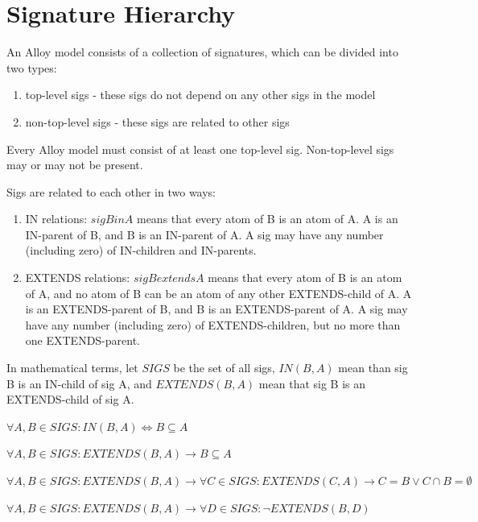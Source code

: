 \section{Signature Hierarchy}


An Alloy model consists of a collection of signatures, which can be divided into two types:

\begin{enumerate}
	\item top-level sigs - these sigs do not depend on any other sigs in the model
	\item non-top-level sigs - these sigs are related to other sigs
\end{enumerate}

Every Alloy model must consist of at least one top-level sig. Non-top-level sigs may or may not be present.

Sigs are related to each other in two ways:

\begin{enumerate}
	\item IN relations: $sig B in A$ means that every atom of B is an atom of A. A is an IN-parent of B, and B is an IN-parent of A. A sig may have any number (including zero) of IN-children and IN-parents.
	\item EXTENDS relations: $sig B extends A$ means that every atom of B is an atom of A, and no atom of B can be an atom of any other EXTENDS-child of A. A is an EXTENDS-parent of B, and B is an EXTENDS-parent of A. A sig may have any number (including zero) of EXTENDS-children, but no more than one EXTENDS-parent.
\end{enumerate}

In mathematical terms, let $SIGS$ be the set of all sigs, $IN(B,A)$ mean than sig B is an IN-child of sig A, and $EXTENDS(B,A)$ mean that sig B is an EXTENDS-child of sig A.


$\forall A,B \in SIGS: IN(B,A) \Leftrightarrow B \subseteq A $

$\forall A,B \in SIGS: EXTENDS(B,A) \rightarrow B \subseteq A$

$\forall A,B \in SIGS: EXTENDS(B,A) \rightarrow \forall C \in SIGS: EXTENDS(C,A) \rightarrow C = B \lor C \cap B = \emptyset $

$\forall A,B \in SIGS: EXTENDS(B,A) \rightarrow \forall D \in SIGS : \lnot EXTENDS(B,D) $







